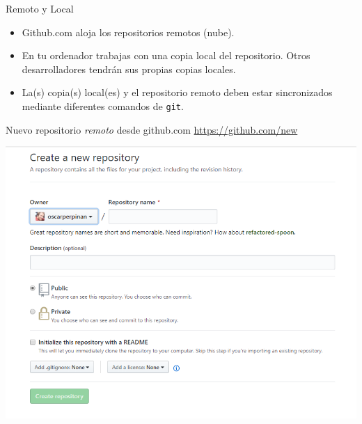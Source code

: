 \documentclass[xcolor={usenames,svgnames,dvipsnames}]{beamer}
\begin{document}
\begin{frame}[label={sec:org0b3dc7c},fragile]{Remoto y Local}
 \begin{itemize}
\item \alert{Github.com} aloja los \alert{repositorios remotos} (nube).
\item En tu ordenador trabajas con una \alert{copia local} del repositorio. Otros desarrolladores tendrán sus propias copias locales.
\item La(s) copia(s) local(es) y el repositorio remoto deben estar \alert{sincronizados} mediante diferentes comandos de \texttt{git}.
\end{itemize}
\end{frame}
\begin{frame}[label={sec:orgcd5414e}]{Nuevo repositorio \emph{remoto} desde github.com}
\url{https://github.com/new}

\begin{center}
\includegraphics[width=.9\linewidth]{figs/GitHub_New_Repository.png}
\end{center}
\end{frame}
\end{document}
